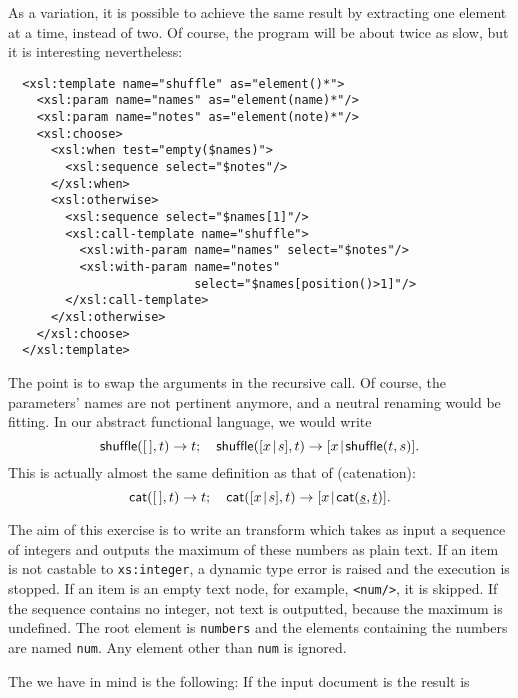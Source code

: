 As a variation, it is possible to achieve the same result by
extracting one element at a time, instead of two. Of course, the
program will be about twice as slow, but it is interesting
nevertheless:
\begin{verbatim}
  <xsl:template name="shuffle" as="element()*">
    <xsl:param name="names" as="element(name)*"/>
    <xsl:param name="notes" as="element(note)*"/>
    <xsl:choose>
      <xsl:when test="empty($names)">
        <xsl:sequence select="$notes"/>
      </xsl:when>
      <xsl:otherwise>
        <xsl:sequence select="$names[1]"/>
        <xsl:call-template name="shuffle">
          <xsl:with-param name="names" select="$notes"/>
          <xsl:with-param name="notes"
                          select="$names[position()>1]"/>
        </xsl:call-template>
      </xsl:otherwise>
    </xsl:choose>
  </xsl:template>
\end{verbatim}
The point is to swap the arguments in the recursive call. Of course,
the parameters' names are not pertinent anymore, and a neutral
renaming would be fitting. In our abstract functional language, we
would write
\begin{equation*}
\textsf{shuffle}([\,],t) \rightarrow t;\quad
\textsf{shuffle}([{x}\!\mid\!{s}],t) \rightarrow [{x}\!\mid\!{\textsf{shuffle}(t,s)}].
\end{equation*}
This is actually almost the same definition as that of  (catenation):
\begin{equation*}
\textsf{cat}([\,],t) \rightarrow t;\quad
\textsf{cat}([{x}\!\mid\!{s}],t) \rightarrow [{x}\!\mid\!{\textsf{cat}(\underline{s},\underline{t})}].
\end{equation*}


The aim of this exercise is to write an \XSLT transform which takes as
input a sequence of integers and outputs the maximum of these numbers
as plain text. If an item is not castable to \texttt{xs:integer}, a
dynamic type error is raised and the execution is stopped. If an item
is an empty text node, for example, \texttt{<num/>}, it is skipped. If
the sequence contains no integer, not text is outputted, because the
maximum is undefined. The root element is \texttt{numbers} and the
elements containing the numbers are named \texttt{num}. Any element
other than \texttt{num} is ignored.

The \DTD we have in mind is the following:
\noindent If the input document is
\noindent the result is


